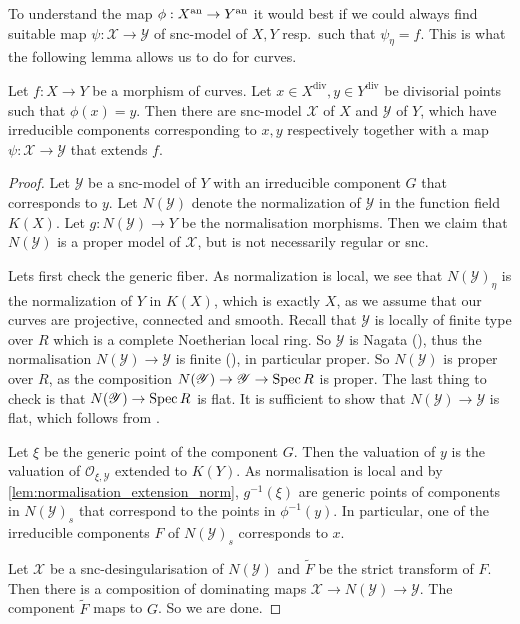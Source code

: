 To understand the map $\phi: X\an \to Y\an$ it would best if we could always find suitable map $\psi: \mathscr X \to \mathscr Y$ of snc-model of $X, Y$ resp.\ such that $\psi_\eta = f$. This is what the following lemma allows us to do for curves. 
\begin{lemma}\label{lem:snc_models_morphism_curves}
	Let $f: X \to Y$ be a morphism of curves. 
	Let $x \in X^{\text{div}}, y \in Y^{\text{div}}$ be divisorial points such that $\phi(x) = y$. 
	Then there are snc-model $\mathscr X$ of $X$ and $\mathscr Y$ of $Y$, which have irreducible components corresponding to $x, y$ respectively together with a map $\psi: \mathscr X \to \mathscr Y$ that extends $f$. 
\end{lemma} 
\begin{proof}
	Let $\mathscr Y$ be a snc-model of $Y$ with an irreducible component $G$ that corresponds to $y$. 
	Let $N(\mathscr Y)$ denote the normalization of $\mathscr Y$ in the function field $K(X)$. 
	Let $g: N(\mathscr Y) \to Y$ be the normalisation morphisms. 
	Then we claim that $N(\mathscr Y)$ is a proper model of $\mathscr X$, but is not necessarily regular or snc. 
	
	Lets first check the generic fiber.
	As normalization is local, we see that  $N(\mathscr Y)_\eta$ is the normalization of $Y$ in $K(X)$, which is exactly $X$, as we assume that our curves are projective, connected and smooth. 
	Recall that $\mathscr Y$ is locally of finite type over $R$ which is a complete Noetherian local ring. 
	So $\mathscr Y$ is Nagata (), thus the normalisation $N(\mathscr Y) \to \mathscr Y$  is finite (), in particular proper. 
	So $N(\mathscr Y)$ is proper over $R$, as the composition $N(\mathscr Y) \to \mathscr Y \to \operatorname{Spec} R$ is proper. 
	The last thing to check is that $N(\mathscr Y) \to \operatorname{Spec} R$ is flat. It is sufficient to show that $N(\mathscr Y) \to \mathscr Y$ is flat, which follows from \cite[thm.\ 18.H]{matsumuraCommutativeAlgebra1980}. 
	
	Let $\xi$ be the generic point of the component $G$. 
	Then the valuation of $y$ is the valuation of $\mathcal{O}_{\xi, \mathscr Y}$ extended to $K\left( Y \right) $. 
	As normalisation is local and by \cref{lem:normalisation_extension_norm}, $g^{-1}(\xi)$ are generic points of components in $N(\mathscr Y)_s$ that correspond to the points in $\phi^{-1}(y)$. 
	In particular, one of the irreducible components $F$ of $N(\mathscr Y)_s$ corresponds to $x$. 

	Let $\mathscr X$ be a snc-desingularisation of $N(\mathscr Y)$ and $\tilde F$ be the strict transform of $F$. 
	Then there is a composition of dominating maps $\mathscr X \to  N(\mathscr Y) \to \mathscr Y$.
	The component $\tilde F$ maps to $G$. So we are done. 
\end{proof}

